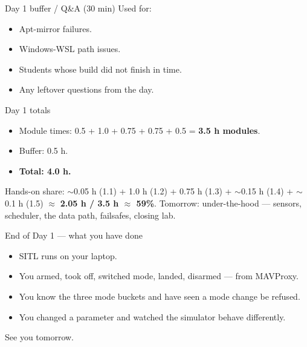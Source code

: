 \documentclass[aspectratio=169,11pt]{beamer}
\begin{document}
\begin{frame}{Day 1 buffer / Q\&A (30 min)}
  Used for:
  \begin{itemize}
    \item Apt-mirror failures.
    \item Windows-WSL path issues.
    \item Students whose build did not finish in time.
    \item Any leftover questions from the day.
  \end{itemize}
\end{frame}

\begin{frame}{Day 1 totals}
  \begin{itemize}
    \item Module times: 0.5 + 1.0 + 0.75 + 0.75 + 0.5 = \textbf{3.5 h modules}.
    \item Buffer: 0.5 h.
    \item \textbf{Total: 4.0 h.}
  \end{itemize}
  Hands-on share: $\sim$0.05 h (1.1) + 1.0 h (1.2) + 0.75 h (1.3) + $\sim$0.15 h (1.4) + $\sim$0.1 h (1.5) $\approx$ \textbf{2.05 h / 3.5 h $\approx$ 59\%}.
  \vfill
  Tomorrow: under-the-hood --- sensors, scheduler, the data path, failsafes, closing lab.
\end{frame}

\begin{frame}{End of Day 1 --- what you have done}
  \begin{itemize}
    \item SITL runs on your laptop.
    \item You armed, took off, switched mode, landed, disarmed --- from MAVProxy.
    \item You know the three mode buckets and have seen a mode change be refused.
    \item You changed a parameter and watched the simulator behave differently.
  \end{itemize}
  \vfill
  \begin{center}\large See you tomorrow.\end{center}
\end{frame}
\end{document}
